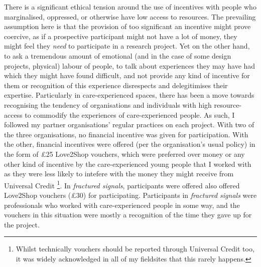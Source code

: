 There is a significant ethical tension around the use of incentives with people who marginalised, oppressed, or otherwise have low access to resources. The prevailing assumption here is that the provision of too significant an incentive might prove coercive, as if a prospective participant might not have a lot of money, they might feel they \textit{need} to participate in a research project. Yet on the other hand, to ask a tremendous amount of emotional (and in the case of some design projects, physical) labour of people, to talk about experiences they may have had which they might have found difficult, and not provide any kind of incentive for them or recognition of this experience disrespects and delegitimises their expertise. Particularly in care-experienced spaces, there has been a move towards recognising the tendency of organisations and individuals with high resource-access to commodify the experiences of care-experienced people. As such, I followed my partner organisations’ regular practices on each project. With two of the three organisations, no financial incentive was given for participation. With the other, financial incentives were offered (per the organisation's usual policy) in the form of £25 Love2Shop vouchers, which were preferred over money or any other kind of incentive by the care-experienced young people that I worked with as they were less likely to intefere with the money they might receive from Universal Credit \footnote{Whilst technically vouchers should be reported through Universal Credit too, it was widely acknowledged in all of my fieldsites that this rarely happens.}. In \emph{fractured signals}, participants were offered also offered Love2Shop vouchers (£30) for participating. Participants in \emph{fractured signals} were professionals who worked with care-experienced people in some way, and the vouchers in this situation were mostly a recognition of the time they gave up for the project. 

